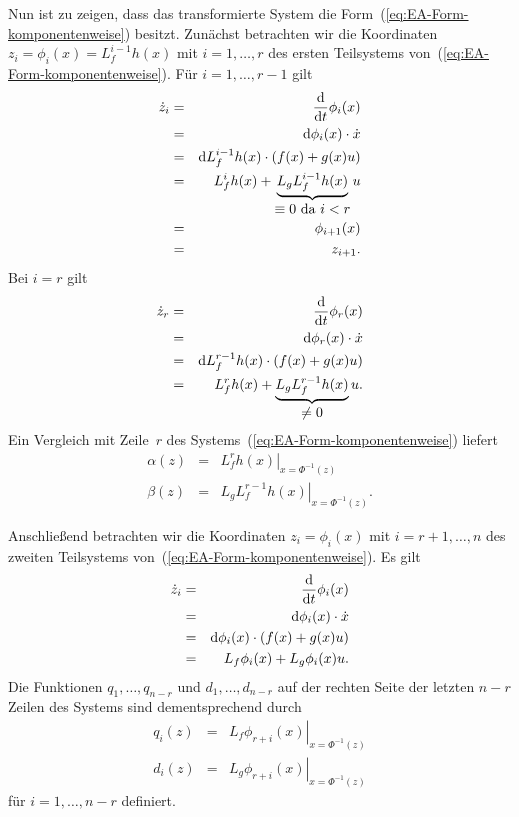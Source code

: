 \begin{svmultproof2}
Nun ist zu zeigen, dass das transformierte System die Form~(\ref{eq:EA-Form-komponentenweise})
besitzt. Zunächst betrachten wir die Koordinaten $z_{i}=\phi_{i}(x)=L_{f}^{i-1}h(x)$
mit $i=1,\ldots,r$ des ersten Teilsystems von~(\ref{eq:EA-Form-komponentenweise}).
Für $i=1,\ldots,r-1$ gilt 
\begin{eqnarray*}
\dot{z}_{i} & = & \frac{{\mathrm{d}}}{{\mathrm{d}} t}\phi_{i}(x)\\
 & = & {\mathrm{d}}\phi_{i}(x)\cdot\dot{x}\\
 & = & {\mathrm{d}} L_{f}^{i-1}h(x)\cdot\left(f(x)+g(x)u\right)\\
 & = & L_{f}^{i}h(x)+\underbrace{L_{g}L_{f}^{i-1}h(x)}_{{\displaystyle \equiv0\mbox{ da }i<r}}u\\
 & = & \phi_{i+1}(x)\\
 & = & z_{i+1}.
\end{eqnarray*}
Bei $i=r$ gilt 
\begin{eqnarray*}
\dot{z}_{r} & = & \frac{{\mathrm{d}}}{{\mathrm{d}} t}\phi_{r}(x)\\
 & = & {\mathrm{d}}\phi_{r}(x)\cdot\dot{x}\\
 & = & {\mathrm{d}} L_{f}^{r-1}h(x)\cdot\left(f(x)+g(x)u\right)\\
 & = & L_{f}^{r}h(x)+\underbrace{L_{g}L_{f}^{r-1}h(x)}_{{\displaystyle \neq0}}u.
\end{eqnarray*}
Ein Vergleich mit Zeile~$r$ des Systems~(\ref{eq:EA-Form-komponentenweise})
liefert
\begin{equation}
\begin{array}{lcl}
\alpha(z) & = & \left.L_{f}^{r}h(x)\right|_{x=\Phi^{-1}(z)}\\
\beta(z) & = & \left.L_{g}L_{f}^{r-1}h(x)\right|_{x=\Phi^{-1}(z)}.
\end{array}\label{eq:alpha-beta-EA-NF}
\end{equation}

Anschließend betrachten wir die Koordinaten $z_{i}=\phi_{i}(x)$ mit
$i=r+1,\ldots,n$ des zweiten Teilsystems von~(\ref{eq:EA-Form-komponentenweise}).
Es gilt
\begin{eqnarray*}
\dot{z}_{i} & = & \frac{{\mathrm{d}}}{{\mathrm{d}} t}\phi_{i}(x)\\
 & = & {\mathrm{d}}\phi_{i}(x)\cdot\dot{x}\\
 & = & {\mathrm{d}}\phi_{i}(x)\cdot\left(f(x)+g(x)u\right)\\
 & = & L_{f}\phi_{i}(x)+L_{g}\phi_{i}(x)u.
\end{eqnarray*}
Die Funktionen $q_{1},\ldots,q_{n-r}$ und $d_{1},\ldots,d_{n-r}$
auf der rechten Seite der letzten $n-r$ Zeilen des Systems sind dementsprechend
durch
\[
\begin{array}{ccc}
q_{i}(z) & = & \left.L_{f}\phi_{r+i}(x)\right|_{x=\Phi^{-1}(z)}\\
d_{i}(z) & = & \left.L_{g}\phi_{r+i}(x)\right|_{x=\Phi^{-1}(z)}
\end{array}
\]
 für $i=1,\ldots,n-r$ definiert.
\end{svmultproof2}

